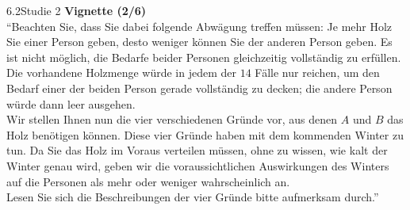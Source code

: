 \documentclass[xcolor=table,9pt,aspectratio=169]{beamer}
\begin{document}
\begin{frame}{\vspace*{10mm}6.2\hspace*{1em}Studie 2}
\textbf{Vignette (2/6)}\\
\medskip
\enquote{Beachten Sie, dass Sie dabei folgende Abwägung treffen müssen: Je mehr Holz Sie einer Person geben, desto weniger können Sie der anderen Person geben. Es ist nicht möglich, die Bedarfe beider Personen gleichzeitig vollständig zu erfüllen. Die vorhandene Holzmenge würde in jedem der $14$ Fälle nur reichen, um den Bedarf einer der beiden Person gerade vollständig zu decken; die andere Person würde dann leer ausgehen.\\
\medskip
Wir stellen Ihnen nun die vier verschiedenen Gründe vor, aus denen $A$ und $B$ das Holz benötigen können. Diese vier Gründe haben mit dem kommenden Winter zu tun. Da Sie das Holz im Voraus verteilen müssen, ohne zu wissen, wie kalt der Winter genau wird, geben wir die voraussichtlichen Auswirkungen des Winters auf die Personen als mehr oder weniger wahrscheinlich an.\\
\medskip
Lesen Sie sich die Beschreibungen der vier Gründe bitte aufmerksam durch.}
\end{frame}
\end{document}
